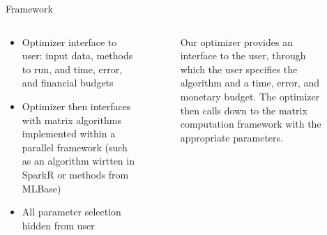 \documentclass[final]{beamer}
\begin{document}
{\begin{frame}{}
\begin{center}
\begin{columns}[t]
\begin{column}{0.32\textwidth}
    \begin{block}{\huge Framework}
\vspace{.1cm}
\begin{columns}[t]
\begin{column}{0.4\textwidth}
\begin{itemize}
\item Optimizer interface to user: input data, methods to run, and time, error, and financial budgets
\item Optimizer then interfaces with matrix algorithms implemented within a parallel framework (such as an algorithm wirtten in SparkR or methods from MLBase)
\item All parameter selection hidden from user
\end{itemize}    
\end{column}
\begin{column}{.6\textwidth}
\begin{center}
\begin{figure}
\caption[width=\textwidth]{Our optimizer provides an interface to the user, through which the user specifies the algorithm and a time, error, and monetary budget. The optimizer then calls down to the matrix computation framework with the appropriate parameters.}
\end{figure}
\end{center}
\end{column}
\end{columns}
\end{block}


\end{column}
\end{columns}
\end{center}
\end{frame}}
\end{document}
